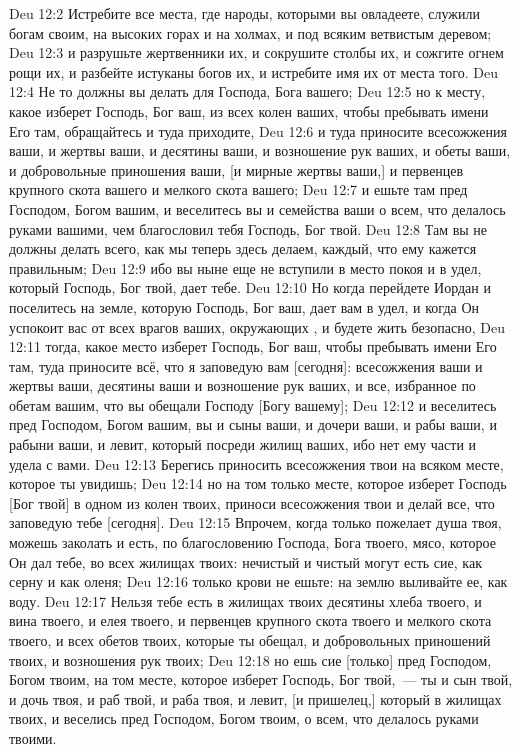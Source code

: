 \vs Deu 12:2 Истребите все места, где народы, которыми вы овладеете, служили богам своим, на высоких горах и на холмах, и под всяким ветвистым деревом;
\vs Deu 12:3 и разрушьте жертвенники их, и сокрушите столбы их, и сожгите огнем рощи их, и разбейте истуканы богов их, и истребите имя их от места того.
\vs Deu 12:4 Не то должны вы делать для Господа, Бога вашего;
\vs Deu 12:5 но к месту, какое изберет Господь, Бог ваш, из всех колен ваших, чтобы пребывать имени Его там, обращайтесь и туда приходите,
\vs Deu 12:6 и туда приносите всесожжения ваши, и жертвы ваши, и десятины ваши, и возношение рук ваших, и обеты ваши, и добровольные приношения ваши, [и мирные жертвы ваши,] и первенцев крупного скота вашего и мелкого скота вашего;
\vs Deu 12:7 и ешьте там пред Господом, Богом вашим, и веселитесь вы и семейства ваши о всем, что делалось руками вашими, чем благословил тебя Господь, Бог твой.
\vs Deu 12:8 Там вы не должны делать всего, как мы теперь здесь делаем, каждый, что ему кажется правильным;
\vs Deu 12:9 ибо вы ныне еще не вступили в место покоя и в удел, который Господь, Бог твой, дает тебе.
\vs Deu 12:10 Но когда перейдете Иордан и поселитесь на земле, которую Господь, Бог ваш, дает вам в удел, и когда Он успокоит вас от всех врагов ваших, окружающих , и будете жить безопасно,
\vs Deu 12:11 тогда, какое место изберет Господь, Бог ваш, чтобы пребывать имени Его там, туда приносите всё, что я заповедую вам [сегодня]: всесожжения ваши и жертвы ваши, десятины ваши и возношение рук ваших, и все, избранное по обетам вашим, что вы обещали Господу [Богу вашему];
\vs Deu 12:12 и веселитесь пред Господом, Богом вашим, вы и сыны ваши, и дочери ваши, и рабы ваши, и рабыни ваши, и левит, который посреди жилищ ваших, ибо нет ему части и удела с вами.
\rsbpar\vs Deu 12:13 Берегись приносить всесожжения твои на всяком месте, которое ты увидишь;
\vs Deu 12:14 но на том только месте, которое изберет Господь [Бог твой] в одном из колен твоих, приноси всесожжения твои и делай все, что заповедую тебе [сегодня].
\vs Deu 12:15 Впрочем, когда только пожелает душа твоя, можешь заколать и есть, по благословению Господа, Бога твоего, мясо, которое Он дал тебе, во всех жилищах твоих: нечистый и чистый могут есть сие, как серну и как оленя;
\vs Deu 12:16 только крови не ешьте: на землю выливайте ее, как воду.
\vs Deu 12:17 Нельзя тебе есть в жилищах твоих десятины хлеба твоего, и вина твоего, и елея твоего, и первенцев крупного скота твоего и мелкого скота твоего, и всех обетов твоих, которые ты обещал, и добровольных приношений твоих, и возношения рук твоих;
\vs Deu 12:18 но ешь сие [только] пред Господом, Богом твоим, на том месте, которое изберет Господь, Бог твой,~--- ты и сын твой, и дочь твоя, и раб твой, и раба твоя, и левит, [и пришелец,] который в жилищах твоих, и веселись пред Господом, Богом твоим, о всем, что делалось руками твоими.
